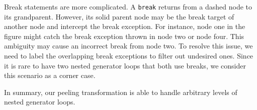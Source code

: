 Break statements are more complicated.
A \texttt{break} returns from a dashed node to its grandparent.
However, its solid parent node may be the break target of another node and intercept the break exception.
For instance, node one in the figure might catch the break exception thrown in node two or node four.
This ambiguity may cause an incorrect break from node two.
To resolve this issue, we need to label the overlapping break exceptions to filter out undesired ones.
Since it is rare to have two nested generator loops that both use breaks, we consider this scenario as a corner case.

In summary, our peeling transformation is able to handle arbitrary levels of nested generator loops.

